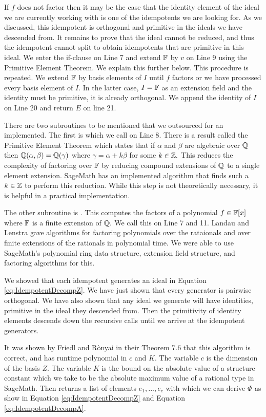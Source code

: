 \documentclass[../thesis.tex]{subfiles}
\begin{document}
If $f$ does not factor then it may be the case that the identity element of the ideal we are currently working with is one of the idempotents we are looking for. As we discussed, this idempotent is orthogonal and primitive in the ideals we have descended from. It remains to prove that the ideal cannot be reduced, and thus the idempotent cannot split to obtain idempotents that are primitive in this ideal. We enter the if-clause on Line 7 and extend $\mathbb{F}$ by $v$ on Line 9 using the Primitive Element Theorem. We explain this further below. This procedure is repeated. We extend $\mathbb{F}$ by basis elements of $I$ until $f$ factors or we have processed every basis element of $I$. In the latter case, $I=\mathbb{F}$ as an extension field and the identity must be primitive, it is already orthogonal. We append the identity of $I$ on Line 20 and return $E$ on line 21.

There are two subroutines to be mentioned that we outsourced for an implemented. The first is  which we call on Line 8. There is a result called the Primitive Element Theorem which states that if $\alpha$ and $\beta$ are algebraic over $\mathbb{Q}$ then $\mathbb{Q}(\alpha,\beta) = \mathbb{Q}(\gamma)$ where $\gamma = \alpha + k\beta$ for some $k\in\mathbb{Z}.$ This reduces the complexity of factoring over $\mathbb{F}$ by reducing compound extensions of $\mathbb{Q}$ to a single element extension. SageMath has an implemented algorithm that finds such a $k\in\mathbb{Z}$ to perform this reduction. While this step is not theoretically necessary, it is helpful in a practical implementation.

The other subroutine is . This computes the factors of a polynomial $f\in\mathbb{F}[x]$ where $\mathbb{F}$ is a finite extension of $\mathbb{Q}.$ We call this on Line 7 and 11. Landau \cite{landau} and Lenstra \cite{lenstra} gave algorithms for factoring polynomials over the rataionals and over finite extensions of the rationals in polynomial time. We were able to use SageMath's polynomial ring data structure, extension field structure, and factoring algorithms for this.

We showed that each idempotent generates an ideal in Equation \ref{eq:IdempotentDecompZ}. We have just shown that every generator is pairwise orthogonal. We have also shown that any ideal we generate will have identities, primitive in the ideal they descended from. Then the primitivity of identity elements descends down the recursive calls until we arrive at the idempotent generators.

It was shown by Friedl and R\`onyai \cite{PolyTimeSolns} in their Theorem 7.6 that this algorithm is correct, and has runtime polynomial in $c$ and $K$. The variable $c$ is the dimension of the basis $Z$. The variable $K$ is the bound on the absolute value of a structure constant which we take to be the absolute maximum value of a rational type in SageMath. Then  returns a list of elements $e_1,...,e_c$ with which we can derive $\Phi$ as show in Equation \ref{eq:IdempotentDecompZ} and Equation \ref{eq:IdempotentDecompA}.
\end{document}
